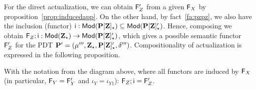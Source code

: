 For the direct actualization, we can obtain $\fu F'_Z$ from a given $\fu
F_X$ by proposition~\ref{prop:inducedapp}. On the other hand,
by fact~\ref{fa:pzpz}, we also have the inclusion (functor) 
$\fu i:\Mod(\thr{P[Z]_\cons})\subseteq\Mod(\thr{P[Z]'_\cons})$.  
Hence, composing we obtain $\comp{\fu
F_Z}{\fu i}:\Mod(\thr{Z_\cons})\to\Mod(\thr{P[Z]'_\cons})$, which gives a
possible semantic functor $\fu F'_Z$ for the PDT
$\thr P'=\pdtsp{\mu'''}{\delta'''}{\thr{Z_\cons}}{\thr{P[Z]'_\cons}}$. 
Compositionality of actualization is expressed in the following proposition.
%
\begin{proposition}
With the notation from the diagram above, where all functors are induced by
$\fu F_X$ (in particular, $\fu F_Y=\fu F'_Y$ and $\iota_Y=\iota_{Y1}$):
$\fu F_Z;\fu i = \fu F'_Z$.
\end{proposition}
